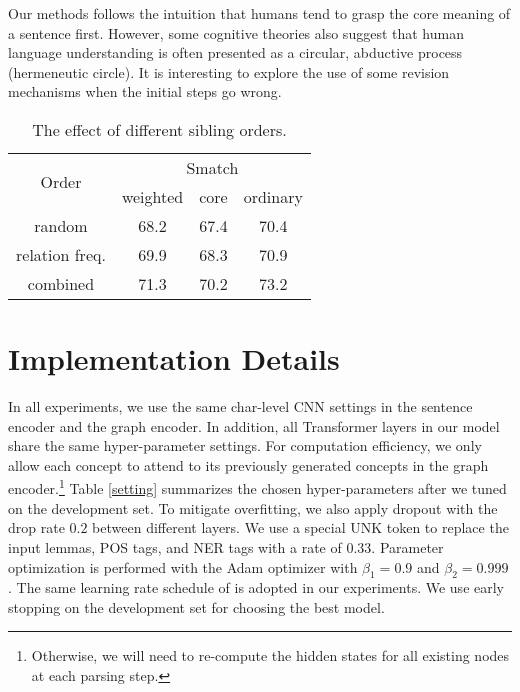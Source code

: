 \documentclass[11pt,a4paper]{article}
\begin{document}
	Our methods follows the intuition that humans tend to grasp the core meaning of a sentence first. However, some cognitive theories \cite{langacker2008cognitive} also suggest that human language understanding is often presented as a circular, abductive process (hermeneutic circle). It is interesting to explore the use of some revision mechanisms when the initial steps go wrong.
	\begin{table}[t]
		\centering
		\begin{tabular}{c|c|c|c}
			\hline
			\multirow{2}{*}{Order} & \multicolumn{3}{c}{Smatch}\\
			\cline{2-4}
			& weighted & core & ordinary \\
			\hline
			random & 68.2 & 67.4& 70.4\\
			relation freq.& 69.9& 68.3&70.9 \\
			combined &71.3&70.2&73.2 \\
			\hline
		\end{tabular}
		\caption{The effect of different sibling orders. }
		\label{variants}
	\end{table}
	
	
\appendix
\newpage
\section{Implementation Details}
In all experiments, we use the same char-level CNN settings in the sentence encoder and the graph encoder. In addition, all Transformer \cite{vaswani2017attention} layers in our model share the same hyper-parameter settings. For computation efficiency, we only allow each concept to attend to its previously generated concepts in the graph encoder.\footnote{Otherwise, we will need to re-compute the hidden states for all existing nodes at each parsing step.} Table \ref{setting} summarizes the chosen hyper-parameters after we tuned on the development set. To mitigate overfitting, we also apply dropout \cite{srivastava2014dropout} with the drop rate $0.2$ between different layers. We use a special UNK token to replace the input lemmas, POS tags, and NER tags with a rate of $0.33$. Parameter optimization is performed with the Adam optimizer \cite{kingma2014adam} with $\beta_1=0.9$ and $\beta_2=0.999$. The same learning rate schedule of \cite{vaswani2017attention} is adopted in our experiments. We use early stopping on the development set for choosing the best model.
\end{document}
